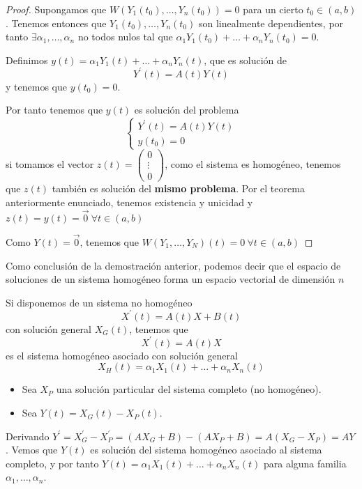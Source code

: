 \begin{proof}
Supongamos que $W(Y_1(t_0), \hdots, Y_n(t_0)) = 0$ para un cierto $t_0 \in (a,b)$. Tenemos entonces que $Y_1(t_0), \hdots, Y_n(t_0)$ son linealmente dependientes, por tanto $\exists \alpha_1,\hdots,\alpha_n$ no todos nulos tal que $\alpha_1Y_1(t_0)+\hdots+\alpha_nY_n(t_0) = 0$.

Definimos $y(t) = \alpha_1Y_1(t)+\hdots+\alpha_nY_n(t)$, que es solución de $$Y^\prime(t) = A(t)Y(t)$$ y tenemos que $y(t_0) = 0$.

Por tanto tenemos que $y(t)$ es solución del problema
\begin{equation*}
  \left\lbrace
  \begin{array}{l}
     Y^\prime(t) = A(t)Y(t)\\
     y(t_0) = 0
  \end{array}
  \right.
\end{equation*}
si tomamos el vector $z(t) = \begin{pmatrix}
0\\\vdots\\0
\end{pmatrix}$, como el sistema es homogéneo, tenemos que $z(t)$ también es solución del \textbf{mismo problema}. Por el teorema anteriormente enunciado, tenemos existencia y unicidad y $z(t) = y(t) = \vec{0}\ \forall t \in (a,b)$

Como $Y(t) = \vec{0}$, tenemos que $W(Y_1,\hdots,Y_N)(t) = 0\ \forall t\in (a,b)$
\end{proof}

Como conclusión de la demostración anterior, podemos decir que el espacio de soluciones de un sistema homogéneo forma un espacio vectorial de dimensión $n$

\vspace{5mm}
\obs

Si disponemos de un sistema no homogéneo $$X^\prime(t) = A(t)X+B(t)$$
con solución general $X_G(t)$, tenemos que $$X^\prime(t) = A(t)X$$ es el sistema homogéneo asociado con solución general $$X_H(t) = \alpha_1X_1(t)+\hdots+\alpha_nX_n(t)$$

\begin{itemize}
\item Sea $X_P$ una solución particular del sistema completo (no homogéneo). 

\item Sea $Y(t) = X_G(t)-X_P(t)$.
\end{itemize}
\noindent Derivando $Y^\prime = X_G^\prime -X_P^\prime = (AX_G+B)-(AX_P+B) = A(X_G-X_P) = AY$.
Vemos que $Y(t)$ es solución del sistema homogéneo asociado al sistema completo, y por tanto $Y(t) = \alpha_1X_1(t)+\hdots+\alpha_nX_n(t)$ para alguna familia $\alpha_1,\hdots,\alpha_n$.

